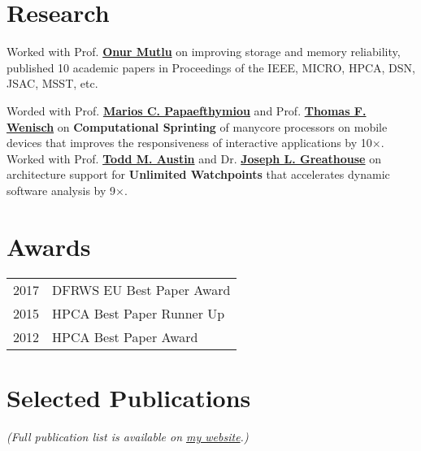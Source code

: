 \documentclass[]{resume}
\begin{document}
\begin{minipage}[t]{0.613\textwidth}

\section{Research}
Worked with Prof\@. \textbf{\href{http://users.ece.cmu.edu/~omutlu/}{Onur Mutlu}} on improving storage and memory reliability, published 10 academic papers in Proceedings of the IEEE, MICRO, HPCA, DSN, JSAC, MSST, etc.
\sectionsep%

Worded with Prof\@. \textbf{\href{http://web.eecs.umich.edu/~marios/}{Marios C. Papaefthymiou}} and Prof\@. \textbf{\href{http://web.eecs.umich.edu/~twenisch/}{Thomas F. Wenisch}} on \textbf{Computational Sprinting} of manycore processors on mobile devices that improves the responsiveness of interactive applications by 10$\times$.
Worked with Prof\@. \textbf{\href{http://web.eecs.umich.edu/~taustin/}{Todd M. Austin}} and Dr\@. \textbf{\href{http://www.computermachines.org/joe/}{Joseph L. Greathouse}} on architecture support for \textbf{Unlimited Watchpoints} that accelerates dynamic software analysis by 9$\times$.


\section{Awards}
\begin{tabular}{rl}
2017 & DFRWS EU Best Paper Award \\
2015 & HPCA Best Paper Runner Up \\
2012 & HPCA Best Paper Award
\end{tabular}
\sectionsep%


\section{Selected Publications}
\textit{(Full publication list is available on \href{http://www.yixinluo.com}{my website}.)}
\vspace{-5pt}
\setlength{\bibsep}{0pt plus 0.3ex}


\nocite{*}

\end{minipage}
\end{document}
